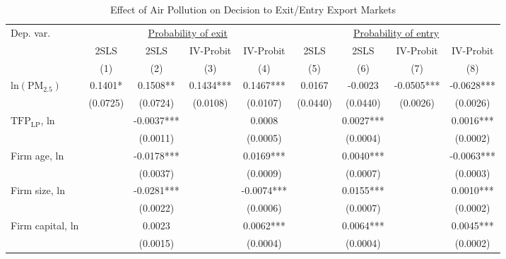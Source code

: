 \documentclass[12pt]{article}
\begin{document}
\begin{table}[H]\centering
  \caption{Effect of Air Pollution on Decision to Exit/Entry Export Markets} \label{tab:entry_exit}
  \resizebox{\textwidth}{!}
  {
  \begin{tabular}{l*{8}{c}}
    \hline\hline
    Dep. var.   &\multicolumn{4}{c}{\underline{Probability of exit}}&\multicolumn{4}{c}{\underline{Probability of entry}}\\
                &2SLS&2SLS &IV-Probit&IV-Probit&2SLS&2SLS&IV-Probit& IV-Probit\\
                &\multicolumn{1}{c}{(1)}&\multicolumn{1}{c}{(2)}&\multicolumn{1}{c}{(3)}&\multicolumn{1}{c}{(4)}&\multicolumn{1}{c}{(5)}&\multicolumn{1}{c}{(6)}&\multicolumn{1}{c}{(7)}&\multicolumn{1}{c}{(8)}\\
   \hline                    
    $\mathrm{ln(PM_{2.5})}$           & 0.1401*	 &0.1508**	  &0.1434***  &0.1467*** & 0.0167   &-0.0023   &-0.0505***&-0.0628*** \\
                                      &(0.0725)	 &(0.0724)    &(0.0108)   &(0.0107)  &(0.0440)	&(0.0440)  &(0.0026)  &(0.0026) \\   
    $\mathrm{TFP_{LP}}$, ln           &          &-0.0037***  &           &0.0008    &          &0.0027*** &          &0.0016***\\
                                      &          &(0.0011)    &           &(0.0005)  &          &(0.0004)  &          &(0.0002)\\
    Firm age, ln	                    &          &-0.0178***	&           &0.0169*** &          &0.0040*** &          &-0.0063***\\
                                      &          &(0.0037)	  &           &(0.0009)  &          &(0.0007)  &          &(0.0003)\\
    Firm size, ln	                    &          &-0.0281***	&           &-0.0074***&          &0.0155*** &          & 0.0010***\\
                                      &          &(0.0022)	  &           &(0.0006)  &          &(0.0007)  &          &(0.0002)\\
    Firm capital, ln	                &          & 0.0023	    &           &0.0062*** &          &0.0064*** &          & 0.0045***\\
                                      &          &(0.0015)	  &           &(0.0004)  &          &(0.0004)  &          &(0.0002)\\
                              

\end{tabular}}
\end{table}
\end{document}

